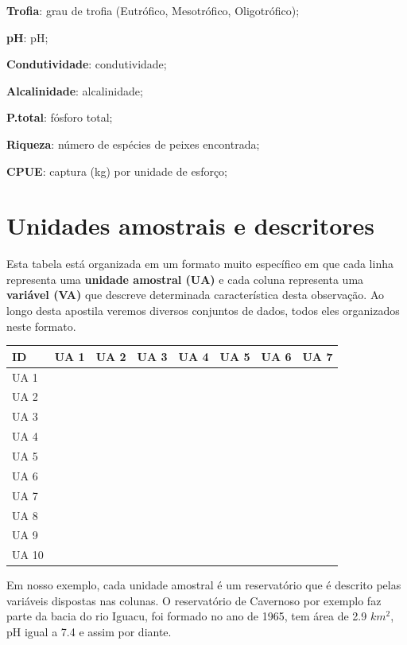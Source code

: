 \documentclass[
]{book}
\begin{document}
\textbf{Trofia}: grau de trofia (Eutrófico, Mesotrófico, Oligotrófico);

\textbf{pH}: pH;

\textbf{Condutividade}: condutividade;

\textbf{Alcalinidade}: alcalinidade;

\textbf{P.total}: fósforo total;

\textbf{Riqueza}: número de espécies de peixes encontrada;

\textbf{CPUE}: captura (kg) por unidade de esforço;

\hypertarget{unidades-amostrais-e-descritores}{%
\section{Unidades amostrais e descritores}\label{unidades-amostrais-e-descritores}}

Esta tabela está organizada em um formato muito específico em que cada linha representa uma \textbf{unidade amostral (UA)} e cada coluna representa uma \textbf{variável (VA)} que descreve determinada característica desta observação. Ao longo desta apostila veremos diversos conjuntos de dados, todos eles organizados neste formato.

\begin{table}
\centering\begingroup\fontsize{11}{13}\selectfont

\begin{tabular}{llllllll}
\toprule
ID & UA 1 & UA 2 & UA 3 & UA 4 & UA 5 & UA 6 & UA 7\\
\midrule
UA 1 &  &  &  &  &  &  & \\
UA 2 &  &  &  &  &  &  & \\
UA 3 &  &  &  &  &  &  & \\
UA 4 &  &  &  &  &  &  & \\
UA 5 &  &  &  &  &  &  & \\
\addlinespace
UA 6 &  &  &  &  &  &  & \\
UA 7 &  &  &  &  &  &  & \\
UA 8 &  &  &  &  &  &  & \\
UA 9 &  &  &  &  &  &  & \\
UA 10 &  &  &  &  &  &  & \\
\bottomrule
\end{tabular}
\endgroup{}
\end{table}

Em nosso exemplo, cada unidade amostral é um reservatório que é descrito pelas variáveis dispostas nas colunas. O reservatório de Cavernoso por exemplo faz parte da bacia do rio Iguacu, foi formado no ano de 1965, tem área de 2.9 \(km^2\), pH igual a 7.4 e assim por diante.
\end{document}
